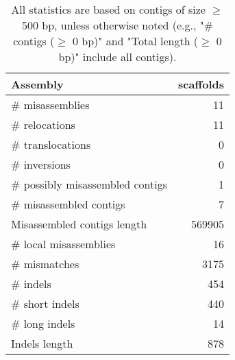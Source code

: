 \documentclass[12pt,a4paper]{article}
\begin{document}
\begin{table}[ht]
\begin{center}
\caption{All statistics are based on contigs of size $\geq$ 500 bp, unless otherwise noted (e.g., "\# contigs ($\geq$ 0 bp)" and "Total length ($\geq$ 0 bp)" include all contigs).}
\begin{tabular}{|l*{1}{|r}|}
\hline
Assembly & scaffolds \\ \hline
\# misassemblies & 11 \\ \hline
\hspace{5mm}\# relocations & 11 \\ \hline
\hspace{5mm}\# translocations & 0 \\ \hline
\hspace{5mm}\# inversions & 0 \\ \hline
\# possibly misassembled contigs & 1 \\ \hline
\# misassembled contigs & 7 \\ \hline
Misassembled contigs length & 569905 \\ \hline
\# local misassemblies & 16 \\ \hline
\# mismatches & 3175 \\ \hline
\# indels & 454 \\ \hline
\hspace{5mm}\# short indels & 440 \\ \hline
\hspace{5mm}\# long indels & 14 \\ \hline
Indels length & 878 \\ \hline
\end{tabular}
\end{center}
\end{table}
\end{document}
